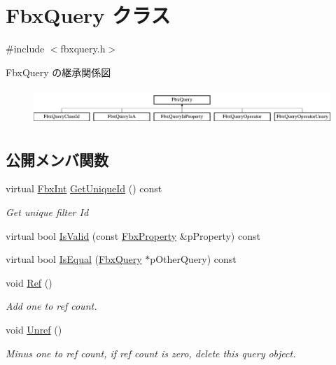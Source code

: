 \hypertarget{class_fbx_query}{}\section{Fbx\+Query クラス}
\label{class_fbx_query}


{\ttfamily \#include $<$fbxquery.\+h$>$}

Fbx\+Query の継承関係図\begin{figure}[H]
\begin{center}
\leavevmode
\includegraphics[height=1.382716cm]{class_fbx_query}
\end{center}
\end{figure}
\subsection*{公開メンバ関数}
\begin{DoxyCompactItemize}
\item 
virtual \hyperlink{fbxtypes_8h_a088fa96de3b0b3ea69f0f6afef525dfb}{Fbx\+Int} \hyperlink{class_fbx_query_ac7daae8f6fa83cd97ae24e93d7b4dc29}{Get\+Unique\+Id} () const
\begin{DoxyCompactList}\small\item\em Get unique filter Id \end{DoxyCompactList}\item 
virtual bool \hyperlink{class_fbx_query_a822776baf45a56d8e126e948ec25d920}{Is\+Valid} (const \hyperlink{class_fbx_property}{Fbx\+Property} \&p\+Property) const
\item 
virtual bool \hyperlink{class_fbx_query_adfc24c7306ceed2fcfd8c67198e0c1dd}{Is\+Equal} (\hyperlink{class_fbx_query}{Fbx\+Query} $\ast$p\+Other\+Query) const
\item 
void \hyperlink{class_fbx_query_a0d945a2be30bcfe72a083f0af90d8252}{Ref} ()
\begin{DoxyCompactList}\small\item\em Add one to ref count. \end{DoxyCompactList}\item 
void \hyperlink{class_fbx_query_a572e8b1922846020818adfbdc2a48f74}{Unref} ()
\begin{DoxyCompactList}\small\item\em Minus one to ref count, if ref count is zero, delete this query object. \end{DoxyCompactList}\end{DoxyCompactItemize}
